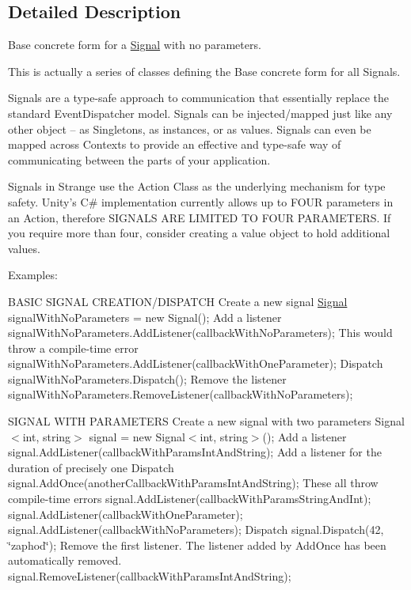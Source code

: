 \subsection{Detailed Description}
Base concrete form for a \hyperlink{classstrange_1_1extensions_1_1signal_1_1impl_1_1_signal}{Signal} with no parameters. 

This is actually a series of classes defining the Base concrete form for all Signals.

Signals are a type-\/safe approach to communication that essentially replace the standard Event\-Dispatcher model. Signals can be injected/mapped just like any other object -- as Singletons, as instances, or as values. Signals can even be mapped across Contexts to provide an effective and type-\/safe way of communicating between the parts of your application.

Signals in Strange use the Action Class as the underlying mechanism for type safety. Unity's C\# implementation currently allows up to F\-O\-U\-R parameters in an Action, therefore S\-I\-G\-N\-A\-L\-S A\-R\-E L\-I\-M\-I\-T\-E\-D T\-O F\-O\-U\-R P\-A\-R\-A\-M\-E\-T\-E\-R\-S. If you require more than four, consider creating a value object to hold additional values.

Examples\-:

B\-A\-S\-I\-C S\-I\-G\-N\-A\-L C\-R\-E\-A\-T\-I\-O\-N/\-D\-I\-S\-P\-A\-T\-C\-H Create a new signal \hyperlink{classstrange_1_1extensions_1_1signal_1_1impl_1_1_signal}{Signal} signal\-With\-No\-Parameters = new Signal(); Add a listener signal\-With\-No\-Parameters.\-Add\-Listener(callback\-With\-No\-Parameters); This would throw a compile-\/time error signal\-With\-No\-Parameters.\-Add\-Listener(callback\-With\-One\-Parameter); Dispatch signal\-With\-No\-Parameters.\-Dispatch(); Remove the listener signal\-With\-No\-Parameters.\-Remove\-Listener(callback\-With\-No\-Parameters);

S\-I\-G\-N\-A\-L W\-I\-T\-H P\-A\-R\-A\-M\-E\-T\-E\-R\-S Create a new signal with two parameters Signal$<$int, string$>$ signal = new Signal$<$int, string$>$(); Add a listener signal.\-Add\-Listener(callback\-With\-Params\-Int\-And\-String); Add a listener for the duration of precisely one Dispatch signal.\-Add\-Once(another\-Callback\-With\-Params\-Int\-And\-String); These all throw compile-\/time errors signal.\-Add\-Listener(callback\-With\-Params\-String\-And\-Int); signal.\-Add\-Listener(callback\-With\-One\-Parameter); signal.\-Add\-Listener(callback\-With\-No\-Parameters); Dispatch signal.\-Dispatch(42, \char`\"{}zaphod\char`\"{}); Remove the first listener. The listener added by Add\-Once has been automatically removed. signal.\-Remove\-Listener(callback\-With\-Params\-Int\-And\-String);

